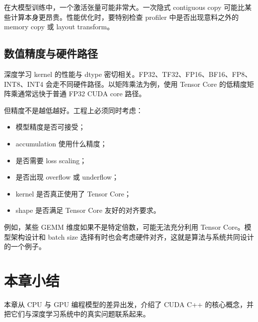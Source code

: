 在大模型训练中，一个激活张量可能非常大。一次隐式 contiguous copy 可能比某些计算本身更昂贵。性能优化时，要特别检查 profiler 中是否出现意料之外的 memory copy 或 layout transform。

\subsection{数值精度与硬件路径}
\label{subsec:numeric-precision-hardware-path}

深度学习 kernel 的性能与 dtype 密切相关。FP32、TF32、FP16、BF16、FP8、INT8、INT4 会走不同硬件路径。以矩阵乘法为例，使用 Tensor Core 的低精度矩阵乘通常远快于普通 FP32 CUDA core 路径。

但精度不是越低越好。工程上必须同时考虑：

\begin{itemize}
  \item 模型精度是否可接受；
  \item accumulation 使用什么精度；
  \item 是否需要 loss scaling；
  \item 是否出现 overflow 或 underflow；
  \item kernel 是否真正使用了 Tensor Core；
  \item shape 是否满足 Tensor Core 友好的对齐要求。
\end{itemize}

例如，某些 GEMM 维度如果不是特定倍数，可能无法充分利用 Tensor Core。模型架构设计和 batch size 选择有时也会考虑硬件对齐，这就是算法与系统共同设计的一个例子。

\section{本章小结}
\label{sec:chapter02-summary}

本章从 CPU 与 GPU 编程模型的差异出发，介绍了 CUDA C++ 的核心概念，并把它们与深度学习系统中的真实问题联系起来。


